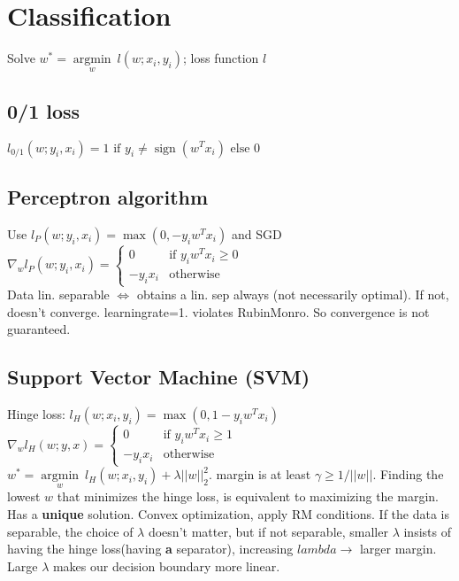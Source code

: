 \section*{Classification}

Solve $w^* = \underset{w}{\operatorname{argmin}} ~ l(w;x_i,y_i)$; loss function $l$

\subsection*{0/1 loss}
$l_{0/1} (w;y_i,x_i) = 1 \text{ if } y_i \neq \operatorname{sign}(w^Tx_i) \text{ else } 0$

\subsection*{Perceptron algorithm}
Use $l_P (w;y_i,x_i) = \operatorname{max}(0, -y_i w^T x_i)$ and SGD\\
$\nabla_w l_P(w;y_i,x_i) = 
\begin{cases}
    0 &\text{if } y_i w^T x_i \geq 0\\
    -y_i x_i &\text{otherwise}
\end{cases}$ \\
Data lin. separable $\Leftrightarrow$ obtains a lin. sep always (not necessarily optimal). If not, doesn't converge. learningrate=1. violates RubinMonro. So convergence is not guaranteed. 

\subsection*{Support Vector Machine (SVM)}
Hinge loss: $l_H(w;x_i,y_i) = \operatorname{max}(0,1-y_i w^T x_i)$ \\
$\nabla_w l_H(w;y,x) = 
\begin{cases}
    0 &\text{if } y_i w^T x_i \geq 1\\
    -y_i x_i &\text{otherwise}
\end{cases}$\\
$w^* = \underset{w}{\operatorname{argmin}} ~ l_H(w;x_i,y_i) + \lambda||w||_2^2$. margin is at least $\gamma \geq 1/||w||$. Finding the lowest $w$ that minimizes the hinge loss, is equivalent to maximizing the margin. Has a \textbf{unique} solution. Convex optimization, apply RM conditions. If the data is separable, the choice of $\lambda$ doesn't matter, but if not separable, smaller $\lambda$ insists of having the hinge loss(having \textbf{a} separator), increasing $lambda \rightarrow$ larger margin. Large $\lambda$ makes our decision boundary more linear. 
